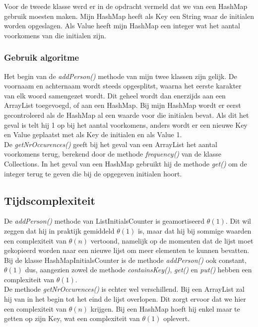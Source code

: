 \documentclass[10pt,a4paper]{report}
\begin{document}
Voor de tweede klasse werd er in de opdracht vermeld dat we van een HashMap gebruik moesten maken. Mijn HashMap heeft als Key een String waar de initialen worden opgeslagen. Als Value heeft mijn HashMap een integer wat het aantal voorkomens van die initialen zijn. 

\subsubsection*{Gebruik algoritme}
Het begin van de \textsl{addPerson()} methode van mijn twee klassen zijn gelijk. De voornaam en achternaam wordt steeds opgesplitst, waarna het eerste karakter van elk woord samengezet wordt. Dit geheel wordt dan enerzijds aan een ArrayList toegevoegd, of aan een HashMap. Bij mijn HashMap wordt er eerst gecontroleerd als de HashMap al een waarde voor die initialen bevat. Als dit het geval is telt hij 1 op bij het aantal voorkomens, anders wordt er een nieuwe Key en Value geplaatst met als Key de initialen en als Value 1.\\

De \textsl{getNrOccurences()} geeft bij het geval van een ArrayList het aantal voorkomens terug, berekend door de methode \textsl{frequency()} van de klasse Collections. In het geval van een HashMap gebruikt hij de methode \textsl{get()} om de integer terug te geven die bij de opgegeven initialen hoort.

\subsection*{Tijdscomplexiteit}
De \textsl{addPerson()} methode van ListInitialsCounter is geamortiseerd $\theta(1)$. Dit wil zeggen dat hij in praktijk gemiddeld $\theta(1)$ is, maar dat hij bij sommige waarden een complexiteit van $\theta(n)$ vertoond, namelijk op de momenten dat de lijst moet gekopieerd worden naar een nieuwe lijst om meer elementen te kunnen bevatten.\\
Bij de klasse HashMapInitialsCounter is de methode \textsl{addPerson()} ook constant, $\theta(1)$ dus, aangezien zowel de methode \textsl{containsKey()}, \textsl{get()} en \textsl{put()} hebben een complexiteit van $\theta(1)$.\\

De methode \textsl{getNrOccurences()} is echter wel verschillend. Bij een ArrayList zal hij van in het begin tot het eind de lijst overlopen. Dit zorgt ervoor dat we hier een complexiteit van $\theta(n)$ krijgen. Bij een HashMap hoeft hij enkel maar te getten op zijn Key, wat een complexiteit van $\theta(1)$ oplevert.
\end{document}
